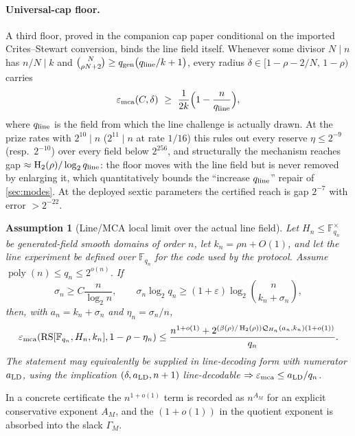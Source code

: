 \documentclass[11pt]{article}
\newtheorem{assumption}[theorem]{Assumption}
\theoremstyle{definition}
\newcommand{\F}{\mathbb F}
\newcommand{\RS}{\operatorname{RS}}
\newcommand{\poly}{\operatorname{poly}}
\newcommand{\eps}{\varepsilon}
\newcommand{\Hbin}{\operatorname{H}_2}
\newcommand{\mca}{\varepsilon_{\rm mca}}
\newcommand{\Qprof}{\mathcal Q}
\newcommand{\qgen}{q_{\rm gen}}
\newcommand{\qline}{q_{\rm line}}
\begin{document}
\paragraph{Universal-cap floor.}
A third floor, proved in the companion cap paper \cite{UniversalCap} conditional on the imported Crites--Stewart conversion, binds the line field itself.  Whenever some divisor $N\mid n$ has $n/N\mid k$ and $\binom{N}{\rho N+2}\ge\qgen\bigl(\qline/k+1\bigr)$, every radius $\delta\in[1-\rho-2/N,\,1-\rho)$ carries
\begin{equation}
\label{eq:cap-floor}
        \mca(C,\delta)\ \ge\ \frac1{2k}\Bigl(1-\frac n{\qline}\Bigr),
\end{equation}
where $\qline$ is the field from which the line challenge is actually drawn.  At the prize rates with $2^{10}\mid n$ ($2^{11}\mid n$ at rate $1/16$) this rules out every reserve $\eta\le2^{-9}$ (resp.\ $2^{-10}$) over every field below $2^{256}$, and structurally the mechanism reaches gap $\approx\Hbin(\rho)/\log_2\qline$: the floor moves with the line field but is never removed by enlarging it, which quantitatively bounds the ``increase $\qline$'' repair of \cref{sec:modes}.  At the deployed sextic parameters the certified reach is gap $2^{-7}$ with error $>2^{-22}$.

\begin{assumption}[Line/MCA local limit over the actual line field]
\label{ass:mca}
Let $H_n\le\F_{q_n}^{\times}$ be generated-field smooth domains of order $n$, let $k_n=\rho n+O(1)$, and let the line experiment be defined over $\F_{q_n}$ for the code used by the protocol.  Assume $\poly(n)\le q_n\le2^{o(n)}$.  If
\[
        \sigma_n\ge C\frac n{\log_2n},
        \qquad
        \sigma_n\log_2q_n\ge(1+\eps)\log_2\binom n{k_n+\sigma_n},
\]
then, with $a_n=k_n+\sigma_n$ and $\eta_n=\sigma_n/n$,
\begin{equation}
\label{eq:mca-assumption}
        \mca(\RS[\F_{q_n},H_n,k_n],1-\rho-\eta_n)
        \le
        \frac{n^{1+o(1)}
        +2^{(\beta(\rho)/\Hbin(\rho))\Qprof_{H_n}(a_n,k_n)(1+o(1))}}{q_n}.
\end{equation}
The statement may equivalently be supplied in line-decoding form with numerator $a_{\rm LD}$, using the implication $(\delta,a_{\rm LD},n+1)$ line-decodable $\Rightarrow\mca\le a_{\rm LD}/q_n$.
\end{assumption}

In a concrete certificate the $n^{1+o(1)}$ term is recorded as $n^{A_M}$ for an explicit conservative exponent $A_M$, and the $(1+o(1))$ in the quotient exponent is absorbed into the slack $\Gamma_M$.
\end{document}

